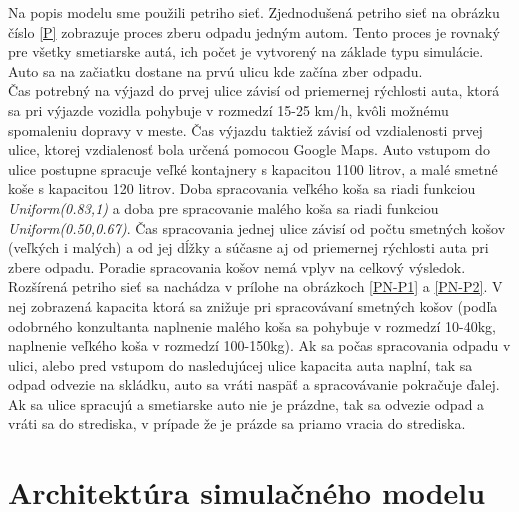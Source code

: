 \documentclass[11pt,a4paper]{article}
\begin{document}
    \indent Na popis modelu sme použili petriho sieť. Zjednodušená petriho sieť na obrázku číslo \ref{P} zobrazuje proces zberu odpadu jedným autom. Tento proces je rovnaký pre všetky smetiarske autá, ich počet je vytvorený na základe typu simulácie. Auto sa na začiatku dostane na prvú ulicu kde začína zber odpadu.\\[0.4em]
    \indent Čas potrebný na výjazd do prvej ulice závisí od priemernej rýchlosti auta, ktorá sa pri výjazde vozidla pohybuje v rozmedzí 15-25 km/h, kvôli možnému spomaleniu dopravy v meste. Čas výjazdu taktiež závisí od vzdialenosti prvej ulice, ktorej vzdialenosť bola určená pomocou Google Maps. Auto vstupom do ulice postupne spracuje veľké kontajnery s kapacitou 1100 litrov, a malé smetné koše s kapacitou 120 litrov. Doba spracovania veľkého koša sa riadi funkciou \textit{Uniform(0.83,1)} a doba pre spracovanie malého koša sa riadi funkciou \textit{Uniform(0.50,0.67)}. Čas spracovania jednej ulice závisí od počtu smetných košov (veľkých i malých) a od jej dĺžky a súčasne aj od priemernej rýchlosti auta pri zbere odpadu. Poradie spracovania košov nemá vplyv na celkový výsledok.\\[0.4em]
    \indent Rozšírená petriho sieť sa nachádza v prílohe na obrázkoch \ref{PN-P1} a \ref{PN-P2}. V nej zobrazená kapacita ktorá sa znižuje pri spracovávaní smetných košov (podľa odobrného konzultanta naplnenie malého koša sa pohybuje v rozmedzí 10-40kg, naplnenie veľkého koša v rozmedzí 100-150kg). Ak sa počas spracovania odpadu v ulici, alebo pred vstupom do nasledujúcej ulice kapacita auta naplní, tak sa odpad odvezie na skládku, auto sa vráti naspäť a spracovávanie pokračuje ďalej. Ak sa ulice spracujú a smetiarske auto nie je prázdne, tak sa odvezie odpad a vráti sa do strediska, v prípade že je prázde sa priamo vracia do strediska.


\section{Architektúra simulačného modelu}
\end{document}
